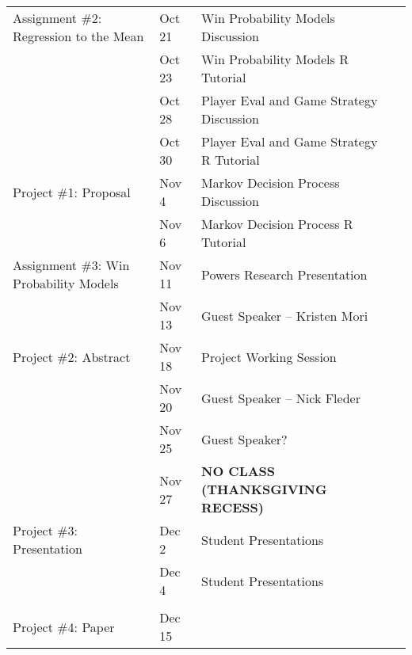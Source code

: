 \documentclass[11pt]{article}
\begin{document}
\begin{adjustwidth}{1cm}{0cm}
\begin{center}
\begin{tabular}{llll}
      \hline
      Assignment \#2: Regression to the Mean    & Oct 21  & Win Probability Models Discussion\\
                                                & Oct 23  & Win Probability Models R Tutorial\\
      \hline
                                                & Oct 28  & Player Eval and Game Strategy Discussion\\
                                                & Oct 30  & Player Eval and Game Strategy R Tutorial\\
      \hline
      Project \#1: Proposal                     & Nov 4   & Markov Decision Process Discussion\\
                                                & Nov 6   & Markov Decision Process R Tutorial\\
      \hline
      Assignment \#3: Win Probability Models    & Nov 11  & Powers Research Presentation\\
                                                & Nov 13  & Guest Speaker -- Kristen Mori\\
      \hline
      Project \#2: Abstract                     & Nov 18  & Project Working Session\\
                                                & Nov 20  & Guest Speaker -- Nick Fleder\\
      \hline
                                                & Nov 25  & Guest Speaker?\\
                                                & Nov 27  & {\bf NO CLASS (THANKSGIVING RECESS)}\\
      \hline
      Project \#3: Presentation                 & Dec 2   & Student Presentations\\
                                                & Dec 4   & Student Presentations\\
      \hline
      \\
      Project \#4: Paper                        & Dec 15  & \\
    \end{tabular}
  \end{center}
\end{adjustwidth}
\end{document}
